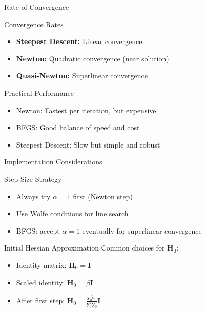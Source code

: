\documentclass[aspectratio=1610]{beamer}
\begin{document}
\begin{frame}{Rate of Convergence}
  \begin{block}{Convergence Rates}
    \begin{itemize}
      \item \textbf{Steepest Descent:} Linear convergence
      \item \textbf{Newton:} Quadratic convergence (near solution)
      \item \textbf{Quasi-Newton:} Superlinear convergence
    \end{itemize}
  \end{block}
  
  \vspace{0.5cm}
  \begin{block}{Practical Performance}
    \begin{itemize}
      \item Newton: Fastest per iteration, but expensive
      \item BFGS: Good balance of speed and cost
      \item Steepest Descent: Slow but simple and robust
    \end{itemize}
  \end{block}
\end{frame}

\begin{frame}{Implementation Considerations}
  \begin{block}{Step Size Strategy}
    \begin{itemize}
      \item Always try $\alpha = 1$ first (Newton step)
      \item Use Wolfe conditions for line search
      \item BFGS: accept $\alpha = 1$ eventually for superlinear convergence
    \end{itemize}
  \end{block}
  
  \vspace{0.5cm}
  \begin{block}{Initial Hessian Approximation}
    Common choices for $\mathbf{H}_0$:
    \begin{itemize}
      \item Identity matrix: $\mathbf{H}_0 = \mathbf{I}$
      \item Scaled identity: $\mathbf{H}_0 = \beta \mathbf{I}$
      \item After first step: $\mathbf{H}_0 = \frac{\mathbf{y}_0^T \mathbf{s}_0}{\mathbf{y}_0^T \mathbf{y}_0} \mathbf{I}$
    \end{itemize}
  \end{block}
\end{frame}
\end{document}
